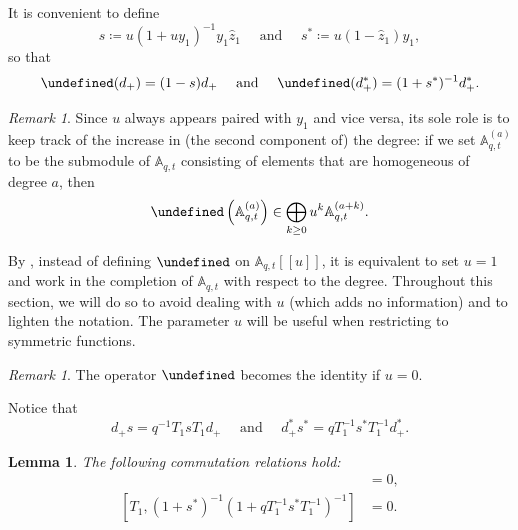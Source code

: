 \documentclass[reqno]{amsart}
\theoremstyle{plain}
\newtheorem{lemma}[theorem]{Lemma}
\theoremstyle{definition}
\theoremstyle{remark}
\newtheorem{remark}[theorem]{Remark}
\newcommand{\A}{\mathbb{A}}%
\newcommand{\z}{\widehat{z}}
\let\oldTheta\Theta
\let\Theta\undefined
\DeclareMathOperator{\Theta}{\oldTheta}
\newcommand{\<}{\langle}
\renewcommand{\>}{\rangle}
\begin{document}
It is convenient to define
\[ s \coloneqq u (1 + u y_1)^{-1} y_1 \z_1 \quad \text{ and } \quad s^* \coloneqq u (1 - \z_1) y_1, \] so that
\[ \Theta(d_+) = (1-s) d_+ \quad \text{ and } \quad \Theta(d_+^*) = (1+s^*)^{-1} d_+^*. \]

\begin{remark}
    \label{rmk:u}
    Since $u$ always appears paired with $y_1$ and vice versa, its sole role is to keep track of the increase in (the second component of) the degree: if we set $\A_{q,t}^{(a)}$ to be the submodule of $\A_{q,t}$ consisting of elements that are homogeneous of degree $a$, then
    \[ \Theta \left( \A_{q,t}^{(a)} \right) \in \bigoplus_{k \geq 0} u^k \A_{q,t}^{(a+k)}. \]
\end{remark}

By , instead of defining $\Theta$ on $\A_{q,t}[[u]]$, it is equivalent to set $u=1$ and work in the completion of $\A_{q,t}$ with respect to the degree. Throughout this section, we will do so to avoid dealing with $u$ (which adds no information) and to lighten the notation. The parameter $u$ will be useful when restricting to symmetric functions.

\begin{remark}
    The operator $\Theta$ becomes the identity if $u=0$.
\end{remark}

Notice that
\begin{equation}
    d_+ s = q^{-1} T_1 s T_1 d_+ \quad \text{ and } \quad d_+^* s^* = q T_1^{-1} s^* T_1^{-1} d_+^*.
\end{equation}

\begin{lemma}
    The following commutation relations hold:
    \begin{align}
        [T_1, (1-s)(1 - q^{-1} T_1 s T_1)] & = 0, \label{eq:T_comm} \\
        [T_1, (1+s^*)^{-1}(1 + q T_1^{-1} s^* T_1^{-1})^{-1}] & = 0 .\label{eq:T_comm*}
    \end{align}
\end{lemma}
\end{document}
